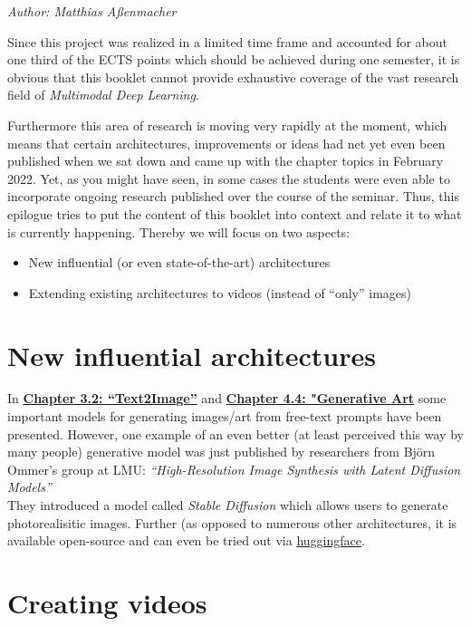 \documentclass[
]{krantz}
\providecommand{\tightlist}{%
  \setlength{\itemsep}{0pt}\setlength{\parskip}{0pt}}
\begin{document}
\emph{Author: Matthias Aßenmacher}

Since this project was realized in a limited time frame and accounted for about one third
of the ECTS points which should be achieved during one semester, it is obvious that this
booklet cannot provide exhaustive coverage of the vast research field of \emph{Multimodal Deep Learning}.

Furthermore this area of research is moving very rapidly at the moment, which means that
certain architectures, improvements or ideas had net yet even been published when we sat down
and came up with the chapter topics in February 2022. Yet, as you might have seen, in some cases the
students were even able to incorporate ongoing research published over the course of the seminar.
Thus, this epilogue tries to put the content of this booklet into context and relate it to what is
currently happening. Thereby we will focus on two aspects:

\begin{itemize}
\tightlist
\item
  New influential (or even state-of-the-art) architectures
\item
  Extending existing architectures to videos (instead of ``only'' images)
\end{itemize}

\hypertarget{new-influential-architectures}{%
\section{New influential architectures}\label{new-influential-architectures}}

In \href{./c02-00-multimodal.html\#c02-02-text2img}{\textbf{Chapter 3.2: ``Text2Image''}} and \href{./c03-00-further.html\#c03-04-usecase}{\textbf{Chapter 4.4: "Generative Art}} some important models for generating images/art from free-text prompts have been presented. However, one example of an even better (at least perceived this way by many people) generative model was just published by researchers from Björn Ommer's group at LMU: \emph{``High-Resolution Image Synthesis with Latent Diffusion Models''}\\
They introduced a model called \emph{Stable Diffusion} which allows users to generate photorealisitic images. Further (as opposed to numerous other architectures, it is available open-source and can even be tried out via \href{https://huggingface.co/spaces/stabilityai/stable-diffusion}{huggingface}.

\hypertarget{creating-videos}{%
\section{Creating videos}\label{creating-videos}}
\end{document}
